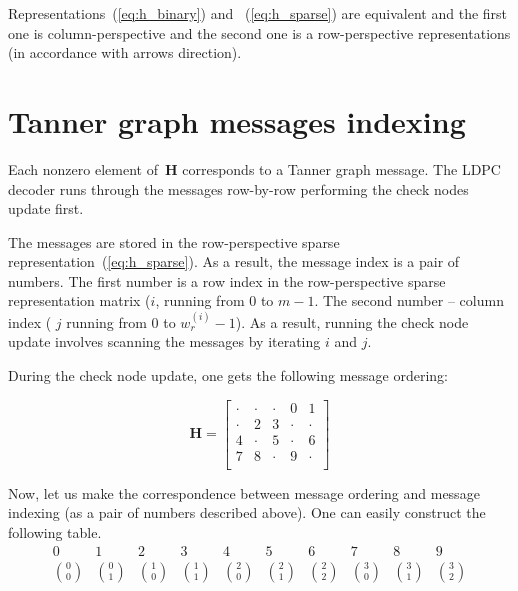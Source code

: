 \documentclass{article}
\begin{document}
Representations~(\ref{eq:h_binary}) and ~(\ref{eq:h_sparse}) are equivalent and the first one is column-perspective and the second one is a row-perspective representations (in accordance with arrows direction).

\section{Tanner graph messages indexing}
Each nonzero element of~$\mathbf{H}$ corresponds to a Tanner graph message. The LDPC decoder runs through the messages row-by-row performing the check nodes update first.

The messages are stored in the row-perspective sparse representation~(\ref{eq:h_sparse}). As a result, the message index is a pair of numbers. The first number is a row index in the row-perspective sparse representation matrix ($i$, running from $0$ to $m - 1$. The second number -- column index ( $j$ running from $0$ to $w_r^{(i)} - 1$). As a result, running the check node update involves scanning the messages by iterating $i$ and $j$. 

During the check node update, one gets the following message ordering:

\begin{equation}
\label{eq:msg_idx}
\mathbf{H} = \left[
\begin{array}{ccccc}
\cdot & \cdot & \cdot &     0 &     1 \\
\cdot &     2 &     3 & \cdot & \cdot \\
    4 & \cdot &     5 & \cdot &     6 \\
7 & 8 & \cdot & 9 & \cdot \\
\end{array}
\right]
\end{equation}

Now, let us make the correspondence between message ordering and message indexing (as a pair of numbers described above). One can easily construct the following table.
\begin{equation}
\label{eq:row_indexing}
\begin{array}{cccccccccc}
0      & 1      & 2      & 3      & 4      & 5      & 6      & 7      & 8      & 9      \\
{0 \choose 0} & {0 \choose 1} & {1 \choose 0} & {1 \choose 1} & {2 \choose 0} & {2 \choose 1} & {2 \choose 2} & {3 \choose 0} & {3 \choose 1} & {3 \choose 2} \\
\end{array}
\end{equation}
\end{document}
